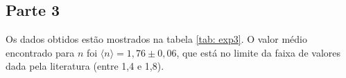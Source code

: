 \subsection*{Parte 3}

Os dados obtidos estão mostrados na tabela \ref{tab: exp3}. O valor médio encontrado para $n$ foi $\langle n \rangle = 1,76 \pm 0,06$, que está no limite da faixa de valores dada pela literatura (entre 1,4 e 1,8).




